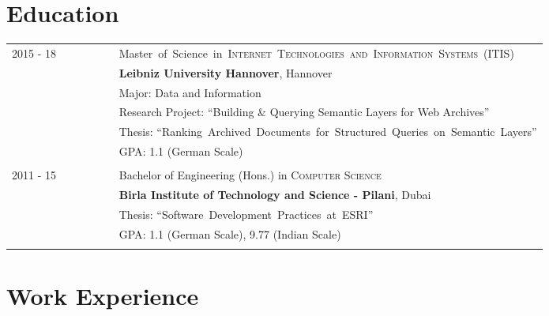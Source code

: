 \documentclass[a4paper,10pt]{article} %
\begin{document}

\section{Education}

\begin{tabular}{l p{0.8\linewidth}}	
\textsc{2015 - 18} & \mbox{Master of Science in \textsc{Internet Technologies and Information Systems (ITIS)}}\\
& \textbf{Leibniz University Hannover}, Hannover\\
& Major: Data and Information\\
& Research Project: ``Building \& Querying Semantic Layers for Web Archives''\\
& Thesis: \mbox{``Ranking Archived Documents for Structured Queries on Semantic Layers''} 
\\
&\normalsize \textsc{GPA}: 1.1 (German Scale)\\
&\\


\textsc{2011 - 15} & Bachelor of Engineering (Hons.) in \textsc{Computer Science}\\
& \textbf{Birla Institute of Technology and Science - Pilani}, Dubai\\
& Thesis: \mbox{``Software Development Practices at ESRI''}\\
&\normalsize \textsc{GPA}: 1.1 (German Scale), 9.77 (Indian Scale)\\
&\\

\end{tabular}



\section{Work Experience}
\end{document}
